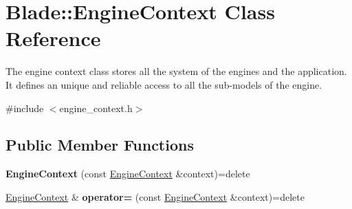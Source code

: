 \hypertarget{class_blade_1_1_engine_context}{}\section{Blade\+:\+:Engine\+Context Class Reference}
\label{class_blade_1_1_engine_context}


The engine context class stores all the system of the engines and the application. It defines an unique and reliable access to all the sub-\/models of the engine.  




{\ttfamily \#include $<$engine\+\_\+context.\+h$>$}

\subsection*{Public Member Functions}
\begin{DoxyCompactItemize}
\item 
\mbox{\label{class_blade_1_1_engine_context_a0432518913109c1063dea7a3b60b267d}} 
{\bfseries Engine\+Context} (const \hyperlink{class_blade_1_1_engine_context}{Engine\+Context} \&context)=delete
\item 
\mbox{\label{class_blade_1_1_engine_context_acd3fdd09e0fb837f5ebd78aac9360748}} 
\hyperlink{class_blade_1_1_engine_context}{Engine\+Context} \& {\bfseries operator=} (const \hyperlink{class_blade_1_1_engine_context}{Engine\+Context} \&context)=delete
\end{DoxyCompactItemize}
